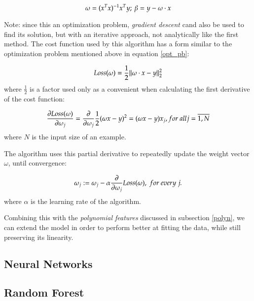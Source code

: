 \begin{equation}
\centering
\omega = (x^{T} x)^{-1} x^{T} y ;\ 
\beta = y - \omega \cdot x
\end{equation}

Note: since this an optimization problem, {\it gradient descent} cand also be 
used to find its solution, but with an iterative approach, not analytically like 
the first method. The cost function used by this algorithm has a form 
similar to the optimization problem mentioned above in equation \ref{opt_pb}: 

\begin{equation}
\centering
Loss(\omega) = \frac{1}{2}\| \omega \cdot x - y \|_{2}^{2}
\end{equation}
where $\frac{1}{2}$ is a factor used only as a convenient when calculating 
the first derivative of the cost function:

\begin{equation}
\centering
\frac{\partial Loss(\omega)}{\partial \omega_{j}} = \frac{\partial}{\partial \omega_{j}}\frac{1}{2}
(\omega x - y)^{2} = (\omega x - y) x_{j}, for\ all j = \overline{1, N}
\end{equation}
where $N$ is the input size of an example.

The algorithm uses this partial derivative to repeatedly update the weight vector 
$\omega$, until convergence:

\begin{equation}
\centering
\omega_{j} := \omega_{j} - \alpha \frac{\partial}{\partial \omega_{j}}Loss(\omega),
\ for\ every\ j.
\end{equation}
where $\alpha$ is the learning rate of the algorithm.

Combining this with the {\it polynomial features} discussed in subsection 
\ref{polyn}, we can extend the model in order to perform better at fitting the 
data, while still preserving its linearity.

\subsection{Neural Networks}

\subsection{Random Forest}
